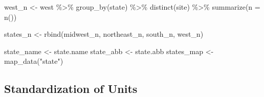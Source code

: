 \documentclass[12pt, twoside]{amherstthesis}
\newenvironment{Shaded}{\begin{snugshade}}{\end{snugshade}}
\newcommand{\AttributeTok}[1]{\textcolor[rgb]{0.77,0.63,0.00}{#1}}
\newcommand{\FunctionTok}[1]{\textcolor[rgb]{0.00,0.00,0.00}{#1}}
\newcommand{\NormalTok}[1]{#1}
\newcommand{\OtherTok}[1]{\textcolor[rgb]{0.56,0.35,0.01}{#1}}
\newcommand{\SpecialCharTok}[1]{\textcolor[rgb]{0.00,0.00,0.00}{#1}}
\newcommand{\StringTok}[1]{\textcolor[rgb]{0.31,0.60,0.02}{#1}}
\begin{document}
\begin{Shaded}
\begin{Highlighting}[]
\NormalTok{west\_n }\OtherTok{\textless{}{-}}\NormalTok{ west }\SpecialCharTok{\%\textgreater{}\%}
  \FunctionTok{group\_by}\NormalTok{(state) }\SpecialCharTok{\%\textgreater{}\%}
  \FunctionTok{distinct}\NormalTok{(site) }\SpecialCharTok{\%\textgreater{}\%}
  \FunctionTok{summarize}\NormalTok{(}\AttributeTok{n =} \FunctionTok{n}\NormalTok{())}

\NormalTok{states\_n }\OtherTok{\textless{}{-}} \FunctionTok{rbind}\NormalTok{(midwest\_n, northeast\_n, south\_n, west\_n)}

\NormalTok{state\_name }\OtherTok{\textless{}{-}}\NormalTok{ state.name}
\NormalTok{state\_abb }\OtherTok{\textless{}{-}}\NormalTok{ state.abb}
\NormalTok{states\_map }\OtherTok{\textless{}{-}} \FunctionTok{map\_data}\NormalTok{(}\StringTok{"state"}\NormalTok{)}
\end{Highlighting}
\end{Shaded}
\hypertarget{standardization-of-units}{%
\subsection{Standardization of Units}\label{standardization-of-units}}
\end{document}
